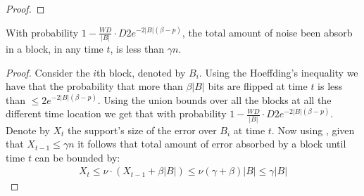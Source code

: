 \documentclass[manuscript,screen,review]{acmart}
\begin{document}
\begin{proof}
\end{proof}

\begin{claim}
  With probability $ 1 - \frac{WD}{|B|} \cdot D 2e^{-2|B|(\beta - p)} $, the total amount of noise been absorb in a block, in any time $t$, is less than $\gamma n$. 
\end{claim}
\begin{proof}
  Consider the $i$th block,  denoted by $B_{i}$. Using the Hoeffding's inequality we have that the probability that more than $\beta |B|$ bits are flipped at time $t$ is less than $ \le 2e^{-2|B|(\beta - p)} $. Using the union bounds over all the blocks at all the different time location we get that with probability $ 1 - \frac{WD}{|B|} \cdot D 2e^{-2|B|(\beta - p)} $. Denote by $X_{t}$ the support's size of the error over $B_{i}$ at time $t$. Now using , given that $X_{t-1} \le \gamma n$ it follows that total amount of error absorbed by a block until time $t$ can be bounded by: 
  \begin{equation*}
    \begin{split}
  X_{t} \le \nu \cdot (X_{t-1} + \beta |B| ) \le  \nu(\gamma+\beta) |B| \le \gamma |B|
    \end{split}
  \end{equation*}

\end{proof}
\end{document}
